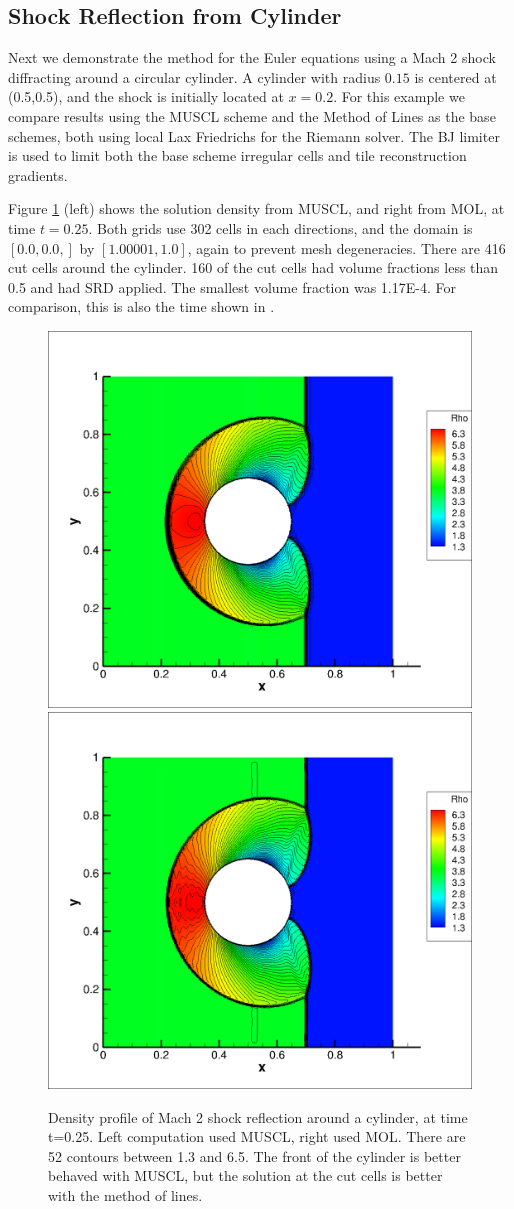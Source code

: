 \clearpage

\subsection{Shock Reflection from  Cylinder}
Next we demonstrate the method for the Euler equations using a Mach 2
shock diffracting around a circular cylinder. A cylinder with radius $0.15$ is centered at
(0.5,0.5), and the shock is initially located at $x = 0.2$.
For this example we compare results using the MUSCL scheme and
the Method of Lines as the base schemes, both using local Lax Friedrichs for the Riemann
solver. The BJ limiter is used to limit
both the base scheme irregular cells  and tile reconstruction gradients. 

Figure \ref{fig:cyl1} (left) shows the solution density from MUSCL, and
right from MOL, at time $t=0.25$. 
Both grids use 302 cells in each
directions, and the domain is  $[0.0,0.0,]$ by  $[1.00001, 1.0]$, again to
prevent mesh degeneracies.
There are 416 cut cells
around the cylinder. 160 of the cut cells had volume fractions less than
0.5 and had SRD applied.  The smallest volume fraction was 1.17E-4.   
For comparison, this is also the time shown in \cite{mjb-hel-rjl:hbox2}. 

\begin{figure}[h]
\begin{center}
\vspace*{-.1in}
\hspace*{-.4in}
\includegraphics[width=0.48\linewidth,trim=10 10 200 10,clip]{figs/muscl_302cells.png}
\includegraphics[width=0.48\linewidth,trim=10 10 200 10,clip]{figs/MOL_302cells.png}
\caption{\sf Density profile of Mach 2 shock reflection around a cylinder,
at time t=0.25.  Left computation used MUSCL, right used MOL. 
There are 52 contours between 1.3 and 6.5.
The front of the cylinder is better behaved with MUSCL, but the solution
at the cut cells is better  with the method of lines.
\label{fig:cyl1}}
\end{center}
\vspace*{-.1in}
\end{figure}

